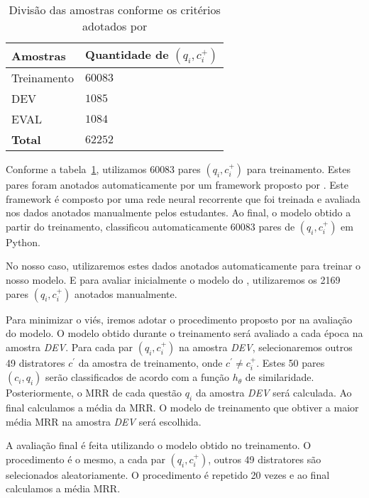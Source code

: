 \documentclass[12pt]{article}
\begin{document}
\begin{table}[h]
\centering
\begin{tabular}{ |p{3cm}|p{3cm}|  }
 \hline
 \textbf{Amostras} & \textbf{Quantidade de $(q_{i}, c_{i}^{+})$}\\
 \hline
 Treinamento & $60083$\\
 \hline
 DEV & $1085$ \\
 \hline
 EVAL & $1084$\\
 \hline
 \textbf{Total} & $62252$\\
 \hline
\end{tabular}
\caption{Divisão das amostras conforme os critérios adotados por \cite{iyer-etal-2016-summarizing}}
\label{table:divisao-amostras}
\end{table}

Conforme a tabela~\ref{table:divisao-amostras}, utilizamos 60083 pares $(q_{i}, c_{i}^{+})$ para treinamento. Estes pares foram anotados automaticamente por um framework proposto por \cite{Yao-staqc:2018}. Este framework é composto por uma rede neural recorrente que foi treinada e avaliada nos dados anotados manualmente pelos estudantes. Ao final, o modelo obtido a partir do treinamento, classificou automaticamente 60083 pares de $(q_{i}, c_{i}^{+})$ em Python.

No nosso caso, utilizaremos estes dados anotados automaticamente para treinar o nosso modelo. E para avaliar inicialmente o modelo do \cite{tan-lstm-qa}, utilizaremos os 2169 pares $(q_{i}, c_{i}^{+})$ anotados manualmente.

Para minimizar o viés, iremos adotar o procedimento proposto por \cite{iyer-etal-2016-summarizing} na avaliação do modelo. O modelo obtido durante o treinamento será avaliado a cada época na amostra \emph{DEV}. Para cada par $(q_{i}, c_{i}^{+})$ na amostra \emph{DEV}, selecionaremos outros 49 distratores $c^{'}$ da amostra de treinamento, onde $c^{'} \neq c_{i}^{+}$. Estes 50 pares $(c_{i}, q_{i})$ serão classificados de acordo com a função $h_{\theta}$ de similaridade. Posteriormente, o MRR de cada questão $q_{i}$ da amostra \emph{DEV} será calculada. Ao final calculamos a média da MRR. O modelo de treinamento que obtiver a maior média MRR na amostra \emph{DEV} será escolhida. 

A avaliação final é feita utilizando o modelo obtido no treinamento. O procedimento é o mesmo, a cada par $(q_{i}, c_{i}^{+})$, outros 49 distratores são selecionados aleatoriamente. O procedimento é repetido 20 vezes e ao final calculamos a média MRR.
\end{document}
